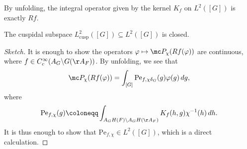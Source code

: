 \documentclass{article}
\begin{document}
\begin{remark}
	By unfolding, the integral operator given by the kernel $K_f$ on $L^2([G])$ is exactly $Rf$.
\end{remark}
\begin{proposition}
	The cuspidal subspace $L^2_{\mathrm{cusp}}([G])\subseteq L^2([G])$ is closed.
\end{proposition}
\begin{proof}[Sketch]
	It is enough to show the operators $\varphi\mapsto\mc P_\chi(Rf(\varphi))$ are continuous, where $f\in C_c^\infty(A_G\backslash G(\AA_F))$. By unfolding, we see that
	\[\mc P_\chi(Rf(\varphi))=\int_{[G]}\operatorname{Pe}_{f,\chi\delta_G}(g)\varphi(g)\,dg,\]
	where
	\[\operatorname{Pe}_{f,\chi}(g)\coloneqq\int_{A_GH(F)\backslash A_GH(\AA_F)}K_f(h,g)\chi^{-1}(h)\,dh.\]
	It is thus enough to show that $\mathrm{Pe}_{f,\chi}\in L^2([G])$, which is a direct calculation.
\end{proof}
\end{document}
